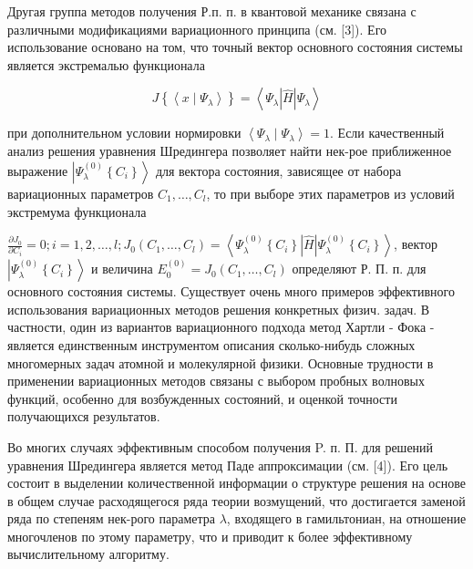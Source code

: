 \documentclass[10pt]{article}
\begin{document}
Другая группа методов получения Р.п. п. в квантовой механике связана с различными модификациями вариационного принципа (см. [3]). Его использование основано на том, что точный вектор основного состояния системы является экстремалью функционала



\[

J\left\{\left\langle x \mid \Psi_{\lambda}\right\rangle\right\}=\left\langle\Psi_{\lambda}|\hat{H}| \Psi_{\lambda}\right\rangle

\]



при дополнительном условии нормировки $\left\langle\Psi_{\lambda} \mid \Psi_{\lambda}\right\rangle=1$. Если качественный анализ решения уравнения Шредингера позволяет найти нек-рое приближенное выражение $\left|\Psi_{\lambda}^{(0)}\left\{C_{i}\right\}\right\rangle$ для вектора состояния, зависящее от набора вариационных параметров $C_{1}, \ldots, C_{l}$, то при выборе этих параметров из условий экстремума функционала



$\frac{\partial J_{0}}{\partial C_{i}}=0 ; i=1,2, \ldots, l ; J_{0}\left(C_{1}, \ldots, C_{l}\right)=\left\langle\Psi_{\lambda}^{(0)}\left\{C_{i}\right\}|\hat{H}| \Psi_{\lambda}^{(0)}\left\{C_{i}\right\}\right\rangle$, вектор $\left|\Psi_{\lambda}^{(0)}\left\{C_{i}\right\}\right\rangle$ и величина $E_{0}^{(0)}=J_{0}\left(C_{1}, \ldots, C_{l}\right)$ определяют Р. П. п. для основного состояния системы. Существует очень много примеров эффективного использования вариационных методов решения конкретных физич. задач. В частности, один из вариантов вариационного подхода метод Хартли - Фока - является единственным инструментом описания сколько-нибудь сложных многомерных задач атомной и молекулярной физики. Основные трудности в применении вариационных методов связаны с выбором пробных волновых функций, особенно для возбужденных состояний, и оценкой точности получающихся результатов.



Во многих случаях эффективным способом получения P. п. П. для решений уравнения Шредингера является метод Паде аппроксимации (см. [4]). Его цель состоит в выделении количественной информации о структуре решения на основе в общем случае расходящегося ряда теории возмущений, что достигается заменой ряда по степеням нек-рого параметра $\lambda$, входящего в гамильтониан, на отношение многочленов по этому параметру, что и приводит к более эффективному вычислительному алгоритму.
\end{document}
